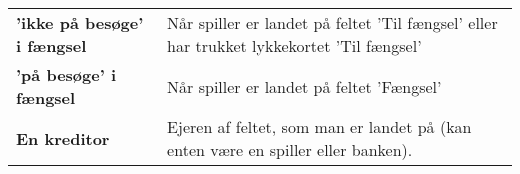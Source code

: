 \documentclass[class=article, crop=false]{standalone}
\begin{document}
    \begin{table}[H]
        \begin{tabularx}{\textwidth}{lX}

            \textbf{'ikke på besøge' i fængsel}& Når spiller er landet på feltet
                                            'Til fængsel' eller har trukket
                                             lykkekortet 'Til fængsel' \\
            \textbf{'på besøge' i fængsel}   & Når spiller er landet på feltet 'Fængsel'\\

            \textbf{En kreditor}   & Ejeren af feltet, som man er landet på (kan enten være en spiller eller banken).\\

        \end{tabularx}
    \end{table}
\end{document}
